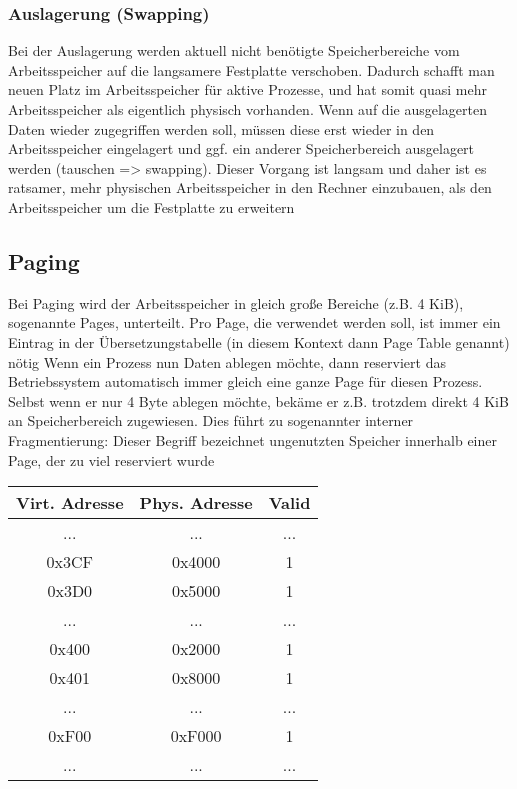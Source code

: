 		\subsubsection{Auslagerung (Swapping)}
			Bei der Auslagerung werden aktuell nicht benötigte Speicherbereiche vom Arbeitsspeicher auf die langsamere Festplatte verschoben. Dadurch schafft man neuen Platz im Arbeitsspeicher für aktive Prozesse, und hat somit quasi  mehr Arbeitsspeicher als eigentlich physisch vorhanden. Wenn auf die ausgelagerten Daten wieder zugegriffen werden soll, müssen diese erst wieder in den Arbeitsspeicher eingelagert und ggf. ein anderer Speicherbereich ausgelagert werden (tauschen => swapping). Dieser Vorgang ist langsam und daher ist es ratsamer, mehr physischen Arbeitsspeicher in den Rechner einzubauen, als den Arbeitsspeicher um die Festplatte zu erweitern
	\subsection{Paging}
		Bei Paging wird der Arbeitsspeicher in gleich große Bereiche (z.B. 4 KiB), sogenannte Pages, unterteilt. Pro Page, die verwendet werden soll, ist immer ein Eintrag in der Übersetzungstabelle (in diesem Kontext dann Page Table genannt) nötig \newline \newline
		Wenn ein Prozess nun Daten ablegen möchte, dann reserviert das Betriebssystem automatisch immer gleich eine ganze Page für diesen Prozess. Selbst wenn er nur 4 Byte ablegen möchte, bekäme er z.B. trotzdem direkt 4 KiB an Speicherbereich zugewiesen. Dies führt zu sogenannter interner Fragmentierung: Dieser Begriff bezeichnet ungenutzten Speicher innerhalb einer Page, der zu viel reserviert wurde \newline \newline
		\begin{center}
			\begin{tabular}{|c|c|c|}
				\hline
				Virt. Adresse & Phys. Adresse & Valid \\
				\hline
				... & ... & ... \\
				\hline 
				0x3CF & 0x4000 & 1 \\
				\hline
				0x3D0 & 0x5000 & 1 \\
				\hline 
				... & ... & ... \\
				\hline
				0x400 & 0x2000 & 1 \\
				\hline
				0x401 & 0x8000 & 1 \\
				\hline 
				... & ... & ... \\
				\hline
				0xF00 & 0xF000 & 1 \\
				\hline
				... & ... & ... \\
				\hline				
			\end{tabular}
		\end{center}
